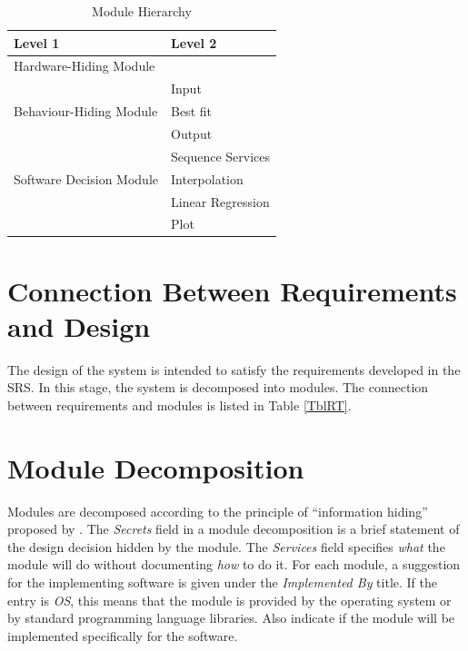 \documentclass[12pt, titlepage]{article}
\begin{document}
\begin{table}[h!]
\centering
\begin{tabular}{p{} p{}}
\toprule
\textbf{Level 1} & \textbf{Level 2}\\
\midrule

{Hardware-Hiding Module} & ~ \\
\midrule

\multirow{3}{0.3\textwidth}{Behaviour-Hiding Module}& Input\\
& Best fit\\
& Output\\

\midrule

\multirow{3}{0.3\textwidth}{Software Decision Module} & Sequence Services\\
& Interpolation\\
& Linear Regression\\
& Plot\\
\bottomrule

\end{tabular}
\caption{Module Hierarchy}
\label{TblMH}
\end{table}

\section{Connection Between Requirements and Design} \label{SecConnection}

The design of the system is intended to satisfy the requirements developed in
the SRS. In this stage, the system is decomposed into modules. The connection
between requirements and modules is listed in Table \ref{TblRT}.

\section{Module Decomposition} \label{SecMD}

Modules are decomposed according to the principle of ``information hiding''
proposed by \citet{ParnasEtAl1984}. The \emph{Secrets} field in a module
decomposition is a brief statement of the design decision hidden by the
module. The \emph{Services} field specifies \emph{what} the module will do
without documenting \emph{how} to do it. For each module, a suggestion for the
implementing software is given under the \emph{Implemented By} title. If the
entry is \emph{OS}, this means that the module is provided by the operating
system or by standard programming language libraries.  Also indicate if the
module will be implemented specifically for the software.
\end{document}

